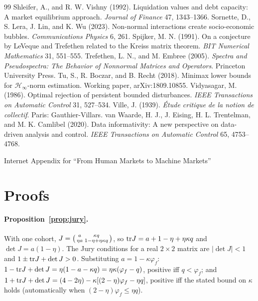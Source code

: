 \documentclass[12pt]{article}
\theoremstyle{definition}
\theoremstyle{remark}
\begin{document}
\begin{thebibliography}{99}
 Shleifer, A., and R. W. Vishny (1992). Liquidation values and debt capacity: A market equilibrium approach. \emph{Journal of Finance} 47, 1343--1366.
 Sornette, D., S. Lera, J. Lin, and K. Wu (2023). Non-normal interactions create socio-economic bubbles. \emph{Communications Physics} 6, 261.
 Spijker, M. N. (1991). On a conjecture by LeVeque and Trefethen related to the Kreiss matrix theorem. \emph{BIT Numerical Mathematics} 31, 551--555.
 Trefethen, L. N., and M. Embree (2005). \emph{Spectra and Pseudospectra: The Behavior of Nonnormal Matrices and Operators}. Princeton University Press.
 Tu, S., R. Boczar, and B. Recht (2018). Minimax lower bounds for $\mathcal H_\infty$-norm estimation. Working paper, arXiv:1809.10855.
 Vidyasagar, M. (1986). Optimal rejection of persistent bounded disturbances. \emph{IEEE Transactions on Automatic Control} 31, 527--534.
 Ville, J. (1939). \emph{\'Etude critique de la notion de collectif}. Paris: Gauthier-Villars.
 van Waarde, H. J., J. Eising, H. L. Trentelman, and M. K. Camlibel (2020). Data informativity: A new perspective on data-driven analysis and control. \emph{IEEE Transactions on Automatic Control} 65, 4753--4768.
\end{thebibliography}

\appendix
\clearpage
\setcounter{page}{1}
\setcounter{section}{0}
\begin{center}{\Large Internet Appendix for ``From Human Markets to Machine Markets''}\end{center}
\label{app:iastart}
\section{Proofs}\label{app:proofs}

\paragraph{Proposition~\ref{prop:jury}.} With one cohort, $J=\begin{psmallmatrix}a&\kappa q\\ \eta a&1-\eta+\eta\kappa q\end{psmallmatrix}$, so ${\rm tr}J=a+1-\eta+\eta\kappa q$ and $\det J=a(1-\eta)$. The Jury conditions for a real $2\times2$ matrix are $|\det J|<1$ and $1\pm{\rm tr}J+\det J>0$. Substituting $a=1-\kappa\varphi_f$: $1-{\rm tr}J+\det J=\eta(1-a-\kappa q)=\eta\kappa(\varphi_f-q)$, positive iff $q<\varphi_f$; and $1+{\rm tr}J+\det J=(4-2\eta)-\kappa[(2-\eta)\varphi_f-\eta q]$, positive iff the stated bound on $\kappa$ holds (automatically when $(2-\eta)\varphi_f\le\eta q$).
\end{document}
